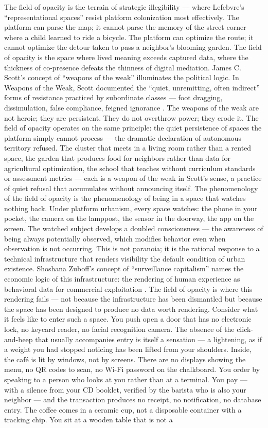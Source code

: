 The field of opacity is the terrain of strategic illegibility — where Lefebvre’s “representational spaces” resist platform colonization most effectively. The platform can parse the map; it cannot parse the memory of the street corner where a child learned to ride a bicycle. The platform can optimize the route; it cannot optimize the detour taken to pass a neighbor’s blooming garden. The field of opacity is the space where lived meaning exceeds captured data, where the thickness of co-presence defeats the thinness of digital mediation. James C. Scott’s concept of “weapons of the weak” illuminates the political logic. In Weapons of the Weak, Scott documented the “quiet, unremitting, often indirect” forms of resistance practiced by subordinate classes — foot dragging, dissimulation, false compliance, feigned ignorance \cite[pp.~29--44]{scott_1985}. The weapons of the weak are not heroic; they are persistent. They do not overthrow power; they erode it. The field of opacity operates on the same principle: the quiet persistence of spaces the platform simply cannot process — the dramatic declaration of autonomous territory refused. The cluster that meets in a living room rather than a rented space, the garden that produces food for neighbors rather than data for agricultural optimization, the school that teaches without curriculum standards or assessment metrics — each is a weapon of the weak in Scott’s sense, a practice of quiet refusal that accumulates without announcing itself. The phenomenology of the field of opacity is the phenomenology of being in a space that watches nothing back. Under platform urbanism, every space watches: the phone in your pocket, the camera on the lamppost, the sensor in the doorway, the app on the screen. The watched subject develops a doubled consciousness — the awareness of being always potentially observed, which modifies behavior even when observation is not occurring. This is not paranoia; it is the rational response to a technical infrastructure that renders visibility the default condition of urban existence. Shoshana Zuboff’s concept of “surveillance capitalism” names the economic logic of this infrastructure: the rendering of human experience as behavioral data for commercial exploitation \cite[pp.~8--67]{zuboff_2019}. The field of opacity is where this rendering fails — not because the infrastructure has been dismantled but because the space has been designed to produce no data worth rendering. Consider what it feels like to enter such a space. You push open a door that has no electronic lock, no keycard reader, no facial recognition camera. The absence of the click-and-beep that usually accompanies entry is itself a sensation — a lightening, as if a weight you had stopped noticing has been lifted from your shoulders. Inside, the café is lit by windows, not by screens. There are no displays showing the menu, no QR codes to scan, no Wi-Fi password on the chalkboard. You order by speaking to a person who looks at you rather than at a terminal. You pay — with a silence from your CD booklet, verified by the barista who is also your neighbor — and the transaction produces no receipt, no notification, no database entry. The coffee comes in a ceramic cup, not a disposable container with a tracking chip. You sit at a wooden table that is not a 